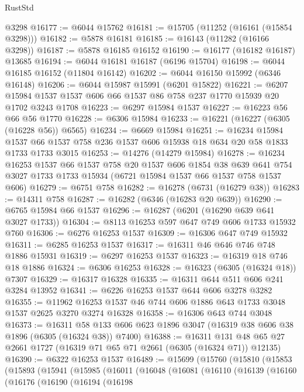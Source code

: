 \begin{lexlean}{RustStd}
\begin{coremodule}
    @3298
@16177 := @6044 @15762
@16181 := @15705 (@11252 (@16161 (@15854 @3298)))
@16182 := @5878 @16181
@16185 := @16143 (@11282 (@16166 @3298))
@16187 := @5878 @16185 @16152
@16190 := @16177 (@16182 @16187) @13685
@16194 := @6044 @16181 @16187 (@6196 @15704)
@16198 := @6044 @16185 @16152 (@11804 @16142)
@16202 := @6044 @16150 @15992 (@6346 @16148)
@16206 := @6044 @15987 @15991 (@6201 @15822)
@16221 := @6207 @15984 @1537 @1537 @606 @66 @1537 @86 @758 @237 @1770 @15939 @20 @1702 @3243 @1708
@16223 := @6297 @15984 @1537
@16227 := @16223 @56 @66 @56 @1770
@16228 := @6306 @15984
@16233 := @16221 (@16227 (@6305 (@16228 @56)) @6565)
@16234 := @6669 @15984
@16251 := @16234
    @15984
    @1537
    @66
    @1537
    @758
    @236
    @1537
    @606
    @15938
    @18
    @634
    @20
    @58
    @1833
    @1733
    @1733
    @3015
@16253 := @14276 (@14279 @15984)
@16278 := @16234
    @16253
    @1537
    @66
    @1537
    @758
    @20
    @1537
    @606
    @1854
    @38
    @639
    @641
    @754
    @3027
    @1733
    @1733
    @15934
    (@6721 @15984 @1537 @66 @1537 @758 @1537 @606)
@16279 := @6751 @758
@16282 := @16278 (@6731 (@16279 @38))
@16283 := @14311 @758
@16287 := @16282 (@6346 (@16283 @20 @639))
@16290 := @6765 @15984 @66 @1537
@16296 := @16287 (@6201 (@16290 @639 @641 @3027 @1733))
@16304 := @8113 @16253 @597 @647 @749 @606 @1733 @15932 @760
@16306 := @6276 @16253 @1537
@16309 := @16306 @647 @749 @15932
@16311 := @6285 @16253 @1537
@16317 := @16311 @46 @646 @746 @748 @1886 @15931
@16319 := @6297 @16253 @1537
@16323 := @16319 @18 @746 @18 @1886
@16324 := @6306 @16253
@16328 := @16323 (@6305 (@16324 @18)) @7307
@16329 := @16317 @16328
@16335 := @16311 @644 @511 @606 @241 @3284 @13952
@16341 := @6226 @16253 @1537 @644 @606 @3278 @3282
@16355 := @11962 @16253 @1537 @46 @744 @606 @1886 @643 @1733 @3048 @1537 @2625 @3270 @3274 @16328
@16358 := @16306 @643 @744 @3048
@16373 := @16311
    @58
    @133
    @606
    @623
    @1896
    @3047
    (@16319 @38 @606 @38 @1896 (@6305 (@16324 @38)) @7400)
@16388 := @16311 @131 @48 @65 @27 @2661 @1727 (@16319 @71 @65 @71 @2661 (@6305 (@16324 @71)) @12135)
@16390 := @6322 @16253 @1537
@16489 := @15699
    (@15760
      (@15810
        (@15853
          (@15893
            (@15941
              (@15985
                (@16011
                  (@16048
                    (@16081
                      (@16110
                        (@16139
                          (@16160
                            (@16176
                              (@16190
                                (@16194
                                  (@16198

\end{coremodule}
\end{lexlean}
